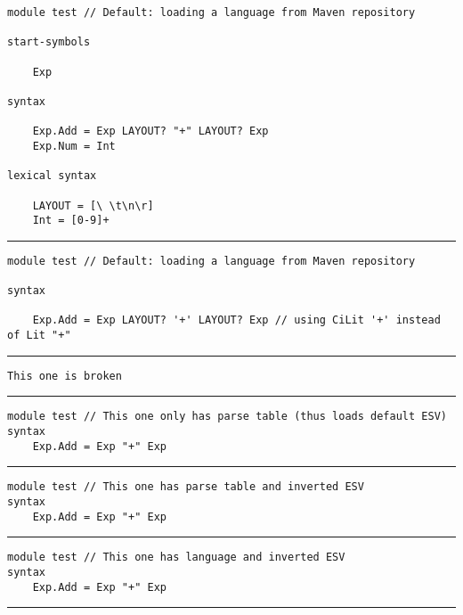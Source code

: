 \documentclass{minimal}
\newcommand{\separate}{\vspace{1em}\hrule\vspace{1em}}
\begin{document}
\begin{verbatim}
module test // Default: loading a language from Maven repository

start-symbols

    Exp

syntax

    Exp.Add = Exp LAYOUT? "+" LAYOUT? Exp
    Exp.Num = Int

lexical syntax

    LAYOUT = [\ \t\n\r]
    Int = [0-9]+
\end{verbatim}

\separate

\begin{verbatim}
module test // Default: loading a language from Maven repository

syntax

    Exp.Add = Exp LAYOUT? '+' LAYOUT? Exp // using CiLit '+' instead of Lit "+"
\end{verbatim}

\separate

\begin{verbatim}
This one is broken
\end{verbatim}

\separate

\begin{verbatim}
module test // This one only has parse table (thus loads default ESV)
syntax
    Exp.Add = Exp "+" Exp
\end{verbatim}

\separate

\begin{verbatim}
module test // This one has parse table and inverted ESV
syntax
    Exp.Add = Exp "+" Exp
\end{verbatim}

\separate

\begin{verbatim}
module test // This one has language and inverted ESV
syntax
    Exp.Add = Exp "+" Exp
\end{verbatim}

\separate
\end{document}
